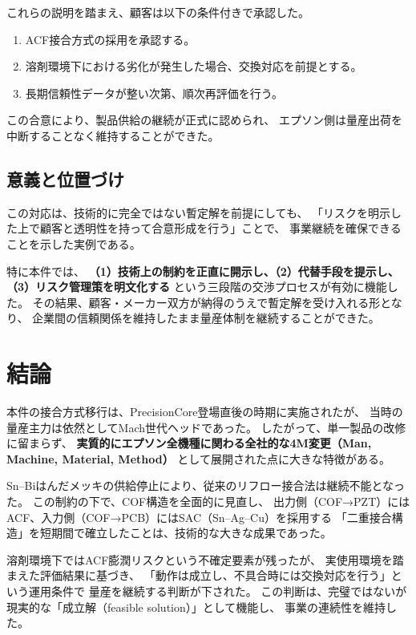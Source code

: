 \documentclass[conference]{IEEEtran}
\begin{document}
これらの説明を踏まえ、顧客は以下の条件付きで承認した。

\begin{enumerate}
  \item ACF接合方式の採用を承認する。  
  \item 溶剤環境下における劣化が発生した場合、交換対応を前提とする。  
  \item 長期信頼性データが整い次第、順次再評価を行う。  
\end{enumerate}

この合意により、製品供給の継続が正式に認められ、  
エプソン側は量産出荷を中断することなく維持することができた。

\subsection{意義と位置づけ}
この対応は、技術的に完全ではない暫定解を前提にしても、  
「リスクを明示した上で顧客と透明性を持って合意形成を行う」ことで、  
事業継続を確保できることを示した実例である。  

特に本件では、  
\textbf{（1）技術上の制約を正直に開示し、（2）代替手段を提示し、（3）リスク管理策を明文化する}  
という三段階の交渉プロセスが有効に機能した。  
その結果、顧客・メーカー双方が納得のうえで暫定解を受け入れる形となり、  
企業間の信頼関係を維持したまま量産体制を継続することができた。

\section{結論}

本件の接合方式移行は、PrecisionCore登場直後の時期に実施されたが、  
当時の量産主力は依然としてMach世代ヘッドであった。  
したがって、単一製品の改修に留まらず、  
\textbf{実質的にエプソン全機種に関わる全社的な4M変更（Man, Machine, Material, Method）}  
として展開された点に大きな特徴がある。  

Sn–Biはんだメッキの供給停止により、従来のリフロー接合法は継続不能となった。  
この制約の下で、COF構造を全面的に見直し、  
出力側（COF→PZT）にはACF、入力側（COF→PCB）にはSAC（Sn–Ag–Cu）を採用する  
「二重接合構造」を短期間で確立したことは、技術的な大きな成果であった。  

溶剤環境下ではACF膨潤リスクという不確定要素が残ったが、  
実使用環境を踏まえた評価結果に基づき、  
「動作は成立し、不具合時には交換対応を行う」という運用条件で  
量産を継続する判断が下された。  
この判断は、完璧ではないが現実的な「成立解（feasible solution）」として機能し、  
事業の連続性を維持した。
\end{document}
